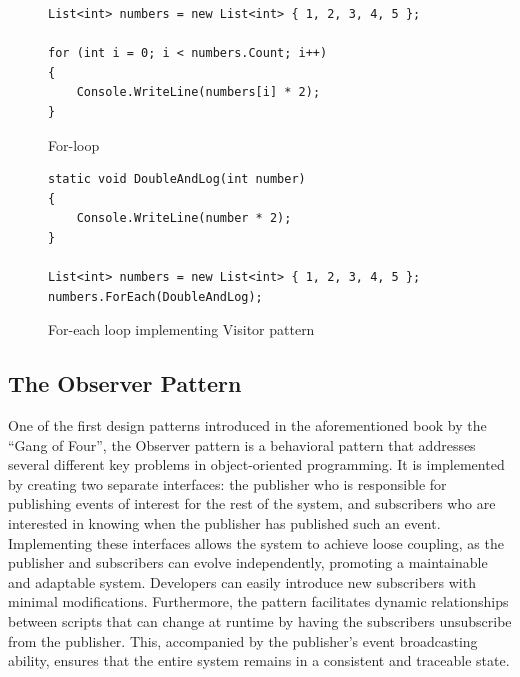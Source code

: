     \begin{figure}[H]
        \begin{lstlisting}[style=csharp]
List<int> numbers = new List<int> { 1, 2, 3, 4, 5 };

for (int i = 0; i < numbers.Count; i++)
{
    Console.WriteLine(numbers[i] * 2);
}
        \end{lstlisting}
        \caption{For-loop}
          \label{fig:for-loop-example}
    \end{figure}


    \begin{figure}[H]
        \begin{lstlisting}[style=csharp]
static void DoubleAndLog(int number)
{
    Console.WriteLine(number * 2);
}

List<int> numbers = new List<int> { 1, 2, 3, 4, 5 };
numbers.ForEach(DoubleAndLog);
        \end{lstlisting}
        \caption{For-each loop implementing Visitor pattern}
          \label{fig:visitor-pattern-example}
    \end{figure}

\subsection{The Observer Pattern}
    One of the first design patterns introduced in the aforementioned book by the “Gang of Four”, the Observer pattern is a behavioral pattern that addresses several different key problems in object-oriented programming. It is implemented by creating two separate interfaces: the publisher who is responsible for publishing events of interest for the rest of the system, and subscribers who are interested in knowing when the publisher has published such an event. Implementing these interfaces allows the system to achieve loose coupling, as the publisher and subscribers can evolve independently, promoting a maintainable and adaptable system. Developers can easily introduce new subscribers with minimal modifications. Furthermore, the pattern facilitates dynamic relationships between scripts that can change at runtime by having the subscribers unsubscribe from the publisher. This, accompanied by the publisher's event broadcasting ability, ensures that the entire system remains in a consistent and traceable state. 


